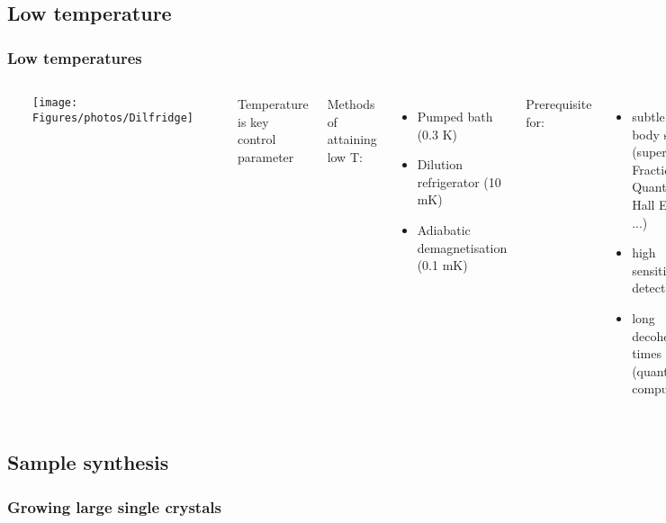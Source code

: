 \subsection{Low temperature}
\begin{frame}[label=LowTemp]
\frametitle{Low temperatures}

\begin{columns}[t]
\centerline{~}
\texttt{[image: \\Figures/photos/Dilfridge]}

\centerline{~}

Temperature is key control parameter

Methods of attaining low T:

\begin{itemize}
\item
Pumped bath  (0.3 K)
\item
Dilution refrigerator	 (10 mK)
\item
Adiabatic demagnetisation (0.1 mK)
\end{itemize}

Prerequisite for:

\begin{itemize}
\item
subtle many body states (superfluidity, Fractional Quantum Hall Effect, ...)
\item
high sensitivity detection
\item
long decoherence times (quantum computation)
\end{itemize}

\end{columns}
\end{frame}



\subsection{Sample synthesis}
\begin{frame}[label=CrystalGrowth]
\frametitle{Growing large single crystals}

\centerline{}
\end{frame}


